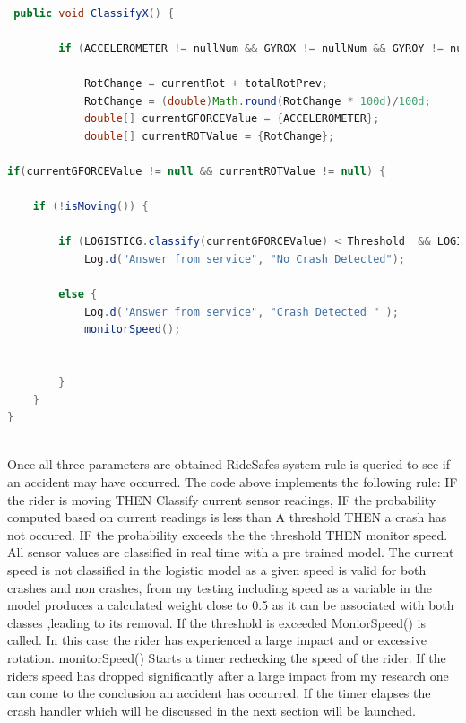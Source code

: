  \begin{lstlisting}[language=Java,basicstyle=\small, breaklines=true, label={lst:labell},caption={RideSafe’s Rule Based System}]

 public void ClassifyX() {

        if (ACCELEROMETER != nullNum && GYROX != nullNum && GYROY != nullNum && GYROZ != nullNum && SPEEDCURR != nullNum) {

            RotChange = currentRot + totalRotPrev;
            RotChange = (double)Math.round(RotChange * 100d)/100d;
            double[] currentGFORCEValue = {ACCELEROMETER};
            double[] currentROTValue = {RotChange};

if(currentGFORCEValue != null && currentROTValue != null) {

    if (!isMoving()) {

        if (LOGISTICG.classify(currentGFORCEValue) < Threshold  && LOGISTICR.classify(currentROTValue) < Threshold)
            Log.d("Answer from service", "No Crash Detected");

        else {
            Log.d("Answer from service", "Crash Detected " );
            monitorSpeed();


        }
    }
}
 
\end{lstlisting}

Once all three parameters are obtained RideSafes system rule is queried to see if an accident may have occurred. The code above implements the following rule:  IF the rider is moving THEN Classify current sensor readings, IF the probability computed based on current readings is less than A threshold THEN a crash has not occured.  IF the probability exceeds the the threshold THEN monitor speed.  All sensor values are classified in real time with a pre trained model. The current speed is not classified in the logistic model as a given speed is valid for both crashes and non crashes, from my testing including speed as a variable in the model produces a calculated weight close to 0.5 as it can be associated with both classes ,leading to its removal. If the threshold is exceeded MoniorSpeed() is called. In this case the rider has experienced a large impact and or excessive rotation. monitorSpeed() Starts a timer rechecking the speed of the rider. If the riders speed has dropped significantly after a large impact from my research one can come to the conclusion an accident has occurred.  If the timer elapses the crash handler which will be discussed in the next section will be launched.

